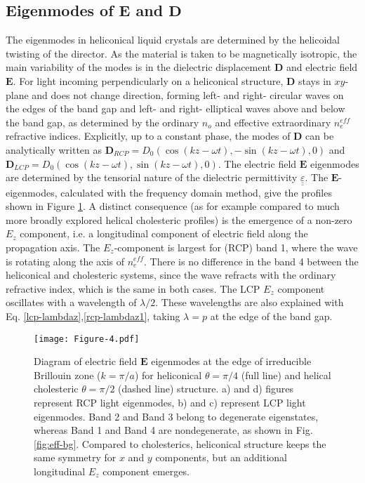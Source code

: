 \documentclass{osa-article}
\renewcommand{\vec}[1]{\mathbf{#1}}
\begin{document}
\subsection{Eigenmodes of $\vec{E}$ and $\vec{D}$}
\label{sec:eigenmodes}
The eigenmodes in heliconical liquid crystals are determined by the helicoidal twisting of the director. 
As the material is taken to be magnetically isotropic, the main variability of the modes is in the dielectric displacement $\vec{D}$ and electric field $\vec{E}$. 
For light incoming perpendicularly on a heliconical structure, $\vec{D}$ stays in $xy$-plane and does not change direction, 
forming left- and right- circular waves on the edges of the band gap and left- and right- elliptical waves above and below the band gap,
as determined by the ordinary $n_o$ and effective extraordinary $n_e^{eff}$ refractive indices. 
Explicitly, up to a constant phase, the modes of $\vec{D}$ can be analytically written as 
$\vec{D}_{RCP}=D_0(\cos (kz-\omega t), - \sin (kz - \omega t), 0)$ and $\vec{D}_{LCP}=D_0(\cos (kz-\omega t), \sin (kz - \omega t), 0)$. 
The electric field $\vec{E}$ eigenmodes are determined by the tensorial nature of the dielectric permittivity $\underline{\underline{\varepsilon}}$. 
The $\vec{E}$-eigenmodes, calculated with the frequency domain method, give the profiles shown in Figure \ref{fig:Ecomponents}. 
A distinct consequence (as for example compared to much more broadly explored helical cholesteric profiles) is the emergence of a non-zero $E_z$ component, 
i.e. a longitudinal component of electric field along the propagation axis. 
The $E_z$-component is largest for (RCP) band 1, where the wave is rotating along the axis of $n_e^{eff}$. 
There is no difference in the band 4 between the heliconical and cholesteric systems, since the wave refracts with the ordinary refractive index, which is the same in both cases.
The LCP $E_z$ component oscillates with a wavelength of $\lambda/2$. 
These wavelengths are also explained with Eq. \ref{lcp-lambdaz},\ref{rcp-lambdaz1}, taking $\lambda=p$ at the edge of the band gap. 

\begin{figure}[h!]
  \centering
  \texttt{[image: Figure-4.pdf]}
  \caption{
Diagram of electric field $\mathbf{E}$ eigenmodes at the edge of irreducible Brillouin zone ($k=\pi/a$) for heliconical $\theta=\pi/4$ (full line) and 
helical cholesteric $\theta=\pi/2$ (dashed line) structure. 
a) and d) figures represent RCP light eigenmodes, b) and c) represent LCP light eigenmodes. 
Band 2 and Band 3 belong to degenerate eigenstates, whereas Band 1 and Band 4 are nondegenerate, as shown in Fig. \ref{fig:eff-bg}. 
Compared to cholesterics, heliconical structure keeps the same symmetry for $x$ and $y$ components, but an additional longitudinal $E_z$ component emerges. 
}
  \label{fig:Ecomponents}
\end{figure}
\end{document}
